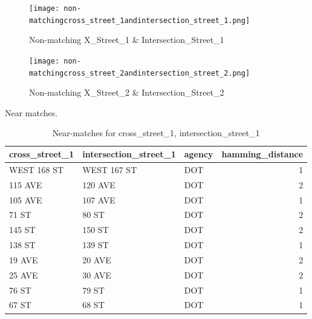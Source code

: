 \documentclass[12pt, titlepage]{article}
\begin{document}
	\begin{figure}[H]
		 \centering
		 \texttt{[image: non-matchingcross\_street\_1andintersection\_street\_1.png]}
		 \caption{Non-matching X\_Street\_1 \& Intersection\_Street\_1}
		 \label{fig:xstreet1}
	\end{figure}	

	\begin{figure}[H]
		 \centering
		 \texttt{[image: non-matchingcross\_street\_2andintersection\_street\_2.png]}
		 \caption{Non-matching X\_Street\_2 \& Intersection\_Street\_2}
		 \label{fig:xstreet2}
	\end{figure}	

Near matches.

\begin{table}[H]
    \centering
    \footnotesize
    \begin{tabular}{l l l r}
        \toprule
        \textbf{cross\_street\_1} & \textbf{intersection\_street\_1} & \textbf{agency} & \textbf{hamming\_distance} \\
        \midrule
        WEST 168 ST    & WEST 167 ST           & DOT    & 1 \\
        115 AVE        & 120 AVE               & DOT    & 2 \\
        105 AVE        & 107 AVE               & DOT    & 1 \\
        71 ST          & 80 ST                 & DOT    & 2 \\
        145 ST         & 150 ST                & DOT    & 2 \\
        138 ST         & 139 ST                & DOT    & 1 \\
        19 AVE         & 20 AVE                & DOT    & 2 \\
        25 AVE         & 30 AVE                & DOT    & 2 \\
        76 ST          & 79 ST                 & DOT    & 1 \\
        67 ST          & 68 ST                 & DOT    & 1 \\
        \bottomrule
    \end{tabular}
    \caption{Near-matches for cross\_street\_1, intersection\_street\_1}
    \label{tab:x1nearmatches}
\end{table}
\end{document}
